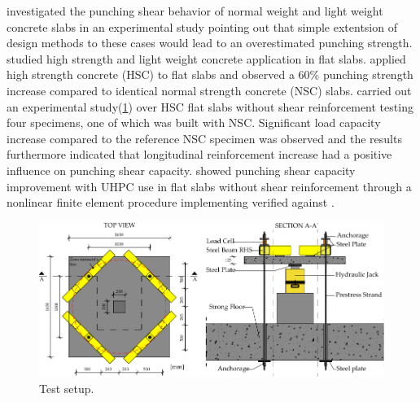 \cite{tomas1993} investigated the punching shear behavior of normal weight and light weight concrete slabs in an experimental study pointing out that simple extentsion of design methods to these cases would lead to an overestimated punching strength. \cite{emam1997seismic,marzouk2001cyclic} studied high strength and light weight concrete application in flat slabs. \cite{hallgren1996punching,hallgren1996} applied high strength concrete (HSC) to flat slabs and observed a 60\% punching strength increase compared to identical normal strength concrete (NSC) slabs. 
\cite{inacio2015} carried out an experimental study(\ref{i2015f1}) over HSC flat slabs without shear reinforcement testing four specimens, one of which was built with NSC. Significant load capacity increase compared to the reference NSC specimen was observed and the results furthermore indicated that longitudinal reinforcement increase had a positive influence on punching shear capacity\citep{inacio2015}. 
%
\cite{kadhim2021} showed punching shear capacity improvement with UHPC use in flat slabs without shear reinforcement through a nonlinear finite element procedure implementing \cite{abaqus} verified against \cite{saleem2011,zohrevand2015punching}. 
\begin{figure}\centering
    \includegraphics[width=\columnwidth]{Figures/i2015f1.pdf}\caption{Test setup\citep{inacio2015}.}\label{i2015f1}
    \end{figure}
    
